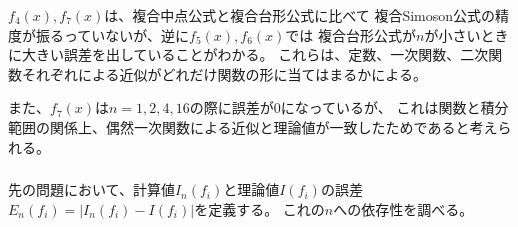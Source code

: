 \documentclass[a4j, titlepage]{jsarticle}
\numberwithin{equation}{section}
\begin{document}
                $f_4(x), f_7(x)$は、複合中点公式と複合台形公式に比べて
                複合Simoson公式の精度が振るっていないが、逆に$f_5(x), f_6(x)$では
                複合台形公式が$n$が小さいときに大きい誤差を出していることがわかる。
                これらは、定数、一次関数、二次関数それぞれによる近似がどれだけ関数の形に当てはまるかによる。

                また、$f_7(x)$は$n=1,2,4,16$の際に誤差が0になっているが、
                これは関数と積分範囲の関係上、偶然一次関数による近似と理論値が一致したためであると考えられる。

        \subsubsection{} \label{sec:4.2.3}
            先の問題において、計算値$I_n(f_i)$と理論値$I(f_i)$の誤差
            $E_n(f_i) = |I_n(f_i) - I(f_i)|$を定義する。
            これの$n$への依存性を調べる。
\end{document}
